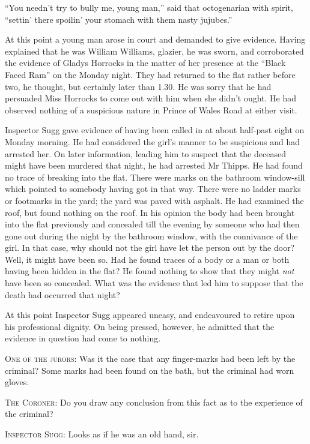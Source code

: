 \enquote{You needn’t try to bully me, young man,} said that octogenarian with spirit, \enquote{settin’ there spoilin’ your stomach with them nasty jujubes.}

At this point a young man arose in court and demanded to give evidence. Having explained that he was William Williams, glazier, he was sworn, and corroborated the evidence of Gladys Horrocks in the matter of her presence at the \enquote{Black Faced Ram} on the Monday night. They had returned to the flat rather before two, he thought, but certainly later than 1.30. He was sorry that he had persuaded Miss Horrocks to come out with him when she didn’t ought. He had observed nothing of a suspicious nature in Prince of Wales Road at either visit.

Inspector Sugg gave evidence of having been called in at about half-past eight on Monday morning. He had considered the girl’s manner to be suspicious and had arrested her. On later information, leading him to suspect that the deceased might have been murdered that night, he had arrested Mr Thipps. He had found no trace of breaking into the flat. There were marks on the bathroom window-sill which pointed to somebody having got in that way. There were no ladder marks or footmarks in the yard; the yard was paved with asphalt. He had examined the roof, but found nothing on the roof. In his opinion the body had been brought into the flat previously and concealed till the evening by someone who had then gone out during the night by the bathroom window, with the connivance of the girl. In that case, why should not the girl have let the person out by the door? Well, it might have been so. Had he found traces of a body or a man or both having been hidden in the flat? He found nothing to show that they might \textit{not} have been so concealed. What was the evidence that led him to suppose that the death had occurred that night?

At this point Inspector Sugg appeared uneasy, and endeavoured to retire upon his professional dignity. On being pressed, however, he admitted that the evidence in question had come to nothing.

\textsc{One of the jurors}: Was it the case that any finger-marks had been left by the criminal?
Some marks had been found on the bath, but the criminal had worn gloves.

\textsc{The Coroner}: Do you draw any conclusion from this fact as to the experience of the criminal?

\textsc{Inspector Sugg}: Looks as if he was an old hand, sir.

